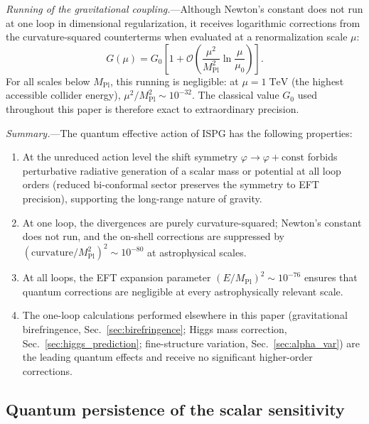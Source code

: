 \documentclass[aps,prd,onecolumn,superscriptaddress,nofootinbib,showpacs,12pt,notitlepage]{revtex4-2}
\newcommand{\Mpl}{M_{\mathrm{Pl}}}
\renewcommand{\order}[1]{\mathcal{O}\!\left(#1\right)}
\begin{document}
\textit{Running of the gravitational coupling.}---Although
Newton's constant does not run at one loop in dimensional
regularization, it receives logarithmic corrections from
the curvature-squared counterterms when evaluated at a
renormalization scale $\mu$:
\begin{equation}\label{eq:G_running}
  G(\mu)
  = G_0\left[1
    + \order{\frac{\mu^2}{\Mpl^2}\ln\frac{\mu}{\mu_0}}
    \right].
\end{equation}
For all scales below $\Mpl$, this running is negligible:
at $\mu = 1\;\mathrm{TeV}$ (the highest accessible
collider energy), $\mu^2/\Mpl^2 \sim 10^{-32}$.  The
classical value $G_0$ used throughout this paper is
therefore exact to extraordinary precision.

\textit{Summary.}---The quantum effective action of ISPG
has the following properties:
\begin{enumerate}
\item[(i)] At the unreduced action level the shift symmetry
  $\varphi \to \varphi + \mathrm{const}$ forbids perturbative
  radiative generation of a scalar mass or potential at all
  loop orders (reduced bi-conformal sector preserves the symmetry
  to EFT precision), supporting the long-range nature of gravity.
\item[(ii)] At one loop, the divergences are purely
  curvature-squared; Newton's constant does not run, and
  the on-shell corrections are suppressed by
  $(\mathrm{curvature}/\Mpl^2)^2 \sim 10^{-80}$ at
  astrophysical scales.
\item[(iii)] At all loops, the EFT expansion parameter
  $(E/\Mpl)^2 \sim 10^{-76}$ ensures that quantum
  corrections are negligible at every astrophysically
  relevant scale.
\item[(iv)] The one-loop calculations performed elsewhere
  in this paper (gravitational birefringence,
  Sec.~\ref{sec:birefringence}; Higgs mass correction,
  Sec.~\ref{sec:higgs_prediction};   fine-structure
  variation, Sec.~\ref{sec:alpha_var}) are the
  leading quantum effects and receive no significant
  higher-order corrections.
\end{enumerate}

\subsection{Quantum persistence of the scalar sensitivity}
\label{sec:scalar_sensitivity}
\end{document}
